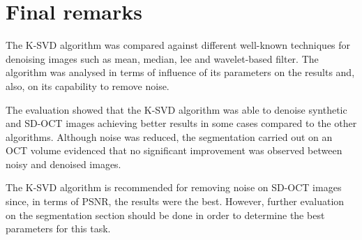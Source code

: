 \section{Final remarks} \label{sc:final-remarks}
The K-SVD algorithm was compared against different well-known techniques for denoising images such as mean, median, lee and wavelet-based filter. The algorithm was analysed in terms of influence of its parameters on the results and, also, on its capability to remove noise.

The evaluation showed that the K-SVD algorithm was able to denoise synthetic and SD-OCT images achieving better results in some cases compared to the other algorithms.  Although noise was reduced, the segmentation carried out on an OCT volume evidenced that no significant improvement was observed between noisy and denoised images.

The K-SVD algorithm is recommended for removing noise on SD-OCT images since, in terms of PSNR, the results were the best. However, further evaluation on the segmentation section should be done in order to determine the best parameters for this task.
